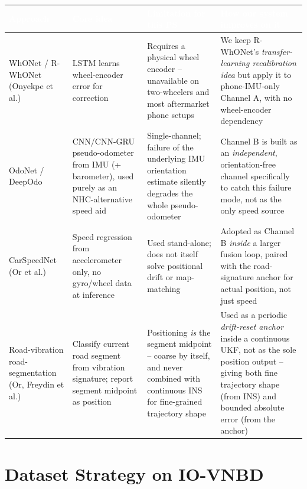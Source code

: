 \documentclass[10.5pt]{article}
\begin{document}
\begin{longtable}{@{}p{3.1cm}p{3.1cm}p{4.3cm}p{4.9cm}@{}}
\toprule
\rowcolor{tablehead}
\textcolor{white}{\textbf{Approach}} & \textcolor{white}{\textbf{Core idea}} & \textcolor{white}{\textbf{Limitation for this PS}} & \textcolor{white}{\textbf{How our system improves on it}} \\
\midrule
\endhead
WhONet / R-WhONet (Onyekpe et al.) & LSTM learns wheel-encoder error for correction & Requires a physical wheel encoder -- unavailable on two-wheelers and most aftermarket phone setups & We keep R-WhONet's \emph{transfer-learning recalibration idea} but apply it to phone-IMU-only Channel A, with no wheel-encoder dependency \\
OdoNet / DeepOdo & CNN/CNN-GRU pseudo-odometer from IMU (+ barometer), used purely as an NHC-alternative speed aid & Single-channel; failure of the underlying IMU orientation estimate silently degrades the whole pseudo-odometer & Channel B is built as an \emph{independent}, orientation-free channel specifically to catch this failure mode, not as the only speed source \\
CarSpeedNet (Or et al.) & Speed regression from accelerometer only, no gyro/wheel data at inference & Used stand-alone; does not itself solve positional drift or map-matching & Adopted as Channel B \emph{inside} a larger fusion loop, paired with the road-signature anchor for actual position, not just speed \\
Road-vibration road-segmentation (Or, Freydin et al.) & Classify current road segment from vibration signature; report segment midpoint as position & Positioning \emph{is} the segment midpoint -- coarse by itself, and never combined with continuous INS for fine-grained trajectory shape & Used as a periodic \emph{drift-reset anchor} inside a continuous UKF, not as the sole position output -- giving both fine trajectory shape (from INS) and bounded absolute error (from the anchor) \\
\bottomrule
\end{longtable}

\section{Dataset Strategy on IO-VNBD}
\end{document}
